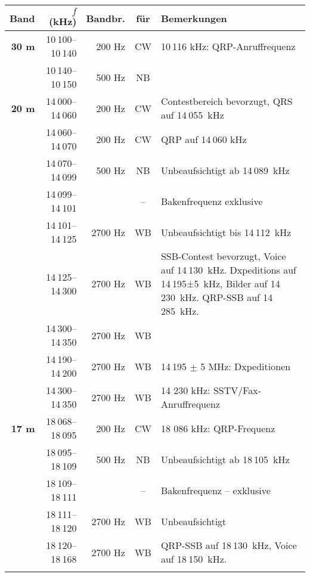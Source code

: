 {\begin{longtabu} to 
\rowfont \bfseries Band & $f$ (kHz) & Bandbr. & für & Bemerkungen \\
\toprule
\endhead
\bfseries 30 m & 10 100–10 140 & 200 Hz & CW & 10 116 kHz: QRP-Anruffrequenz \\  \midrule
 & 10 140–10 150 & 500 Hz & NB \\  \midrule

\bfseries 20 m & 14 000–14 060 & 200 Hz & CW & Contestbereich bevorzugt, QRS auf 14 055 kHz \\  \midrule
 & 14 060–14 070 & 200 Hz & CW & QRP auf 14 060 kHz \\ \midrule
 & 14 070–14 099 & 500 Hz & NB & Unbeaufsichtigt ab 14 089 kHz \\ \midrule
 & 14 099–14 101 &        & -- & Bakenfrequenz exklusive \\ \midrule
 & 14 101–14 125 & 2700 Hz & WB & Unbeaufsichtigt bis 14 112 kHz \\ \midrule
 & 14 125–14 300 & 2700 Hz & WB & SSB-Contest bevorzugt, Voice auf 14 130 kHz. Dxpeditions auf 14 195±5 kHz, Bilder auf 14 230 kHz. QRP-SSB auf 14 285 kHz. \\ \midrule
 & 14 300–14 350 & 2700 Hz & WB &  \\ \midrule
 & 14 190–14 200 & 2700 Hz & WB & 14 195 $\pm$ 5 MHz: Dxpeditionen \\ \midrule
 & 14 300–14 350 & 2700 Hz & WB & 14 230 kHz: SSTV/Fax-Anruffrequenz \\  \midrule
 
\bfseries 17 m & 18 068–18 095 & 200 Hz & CW & 18 086 kHz: QRP-Frequenz \\  \midrule
 & 18 095–18 109 & 500 Hz & NB & Unbeaufsichtigt ab 18 105 kHz \\ \midrule
 & 18 109–18 111 &        & -- & Bakenfrequenz – exklusive \\ \midrule
 & 18 111–18 120 & 2700 Hz & WB & Unbeaufsichtigt \\ \midrule
 & 18 120–18 168 & 2700 Hz & WB & QRP-SSB auf 18 130 kHz, Voice auf 18 150 kHz.  \\  \midrule
 

\end{longtabu}}
